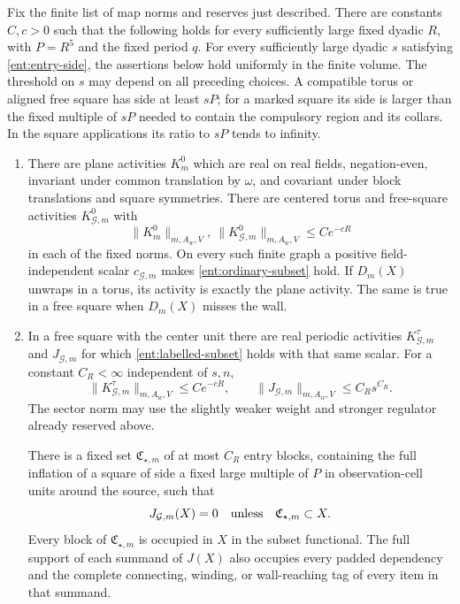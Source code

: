 \begin{theorem}\label{ent:initialization}
Fix the finite list of map norms and reserves just described.  There
are constants \(C,c>0\) such that the following holds for every
sufficiently large fixed dyadic \(R\), with \(P=R^5\) and the fixed
period \(q\).  For every sufficiently large dyadic \(s\) satisfying
\eqref{ent:entry-side}, the assertions below hold uniformly in the
finite volume.  The threshold on \(s\) may depend on all preceding
choices.  A compatible torus or aligned free square has side at
least \(sP\); for a marked square its side is larger than the fixed
multiple of \(sP\) needed to contain the compulsory region and its
collars.  In the square applications its ratio to \(sP\) tends to
infinity.

\begin{enumerate}
\item There are plane activities \(K_m^0\) which are real on real
fields, negation-even, invariant under common translation by
\(\omega\), and covariant under block translations and square
symmetries.  There are centered torus and free-square activities
\(K_{\mathcal G,m}^0\) with
\[
                  \|K_m^0\|_{m,A_w,V},
                  \ \|K_{\mathcal G,m}^0\|_{m,A_w,V}
                         \le Ce^{-cR}
\]
in each of the fixed norms.  On every such finite graph a positive
field-independent scalar \(c_{\mathcal G,m}\) makes
\eqref{ent:ordinary-subset} hold.  If \(D_m(X)\) unwraps in a torus,
its activity is exactly the plane activity.  The same is true in a
free square when \(D_m(X)\) misses the wall.

\item In a free square with the center unit there are real periodic
activities \(K_{\mathcal G,m}^\tau\) and \(J_{\mathcal G,m}\) for which
\eqref{ent:labelled-subset} holds with that same scalar.  For a constant
\(C_R<\infty\) independent of \(s,n\),
\begin{equation}\label{ent:label-norm}
 \|K_{\mathcal G,m}^\tau\|_{m,A_w,V}\le Ce^{-cR},
 \qquad
 \|J_{\mathcal G,m}\|_{m,A_w,V}\le C_Rs^{C_R}.
\end{equation}
The sector norm may use the slightly weaker weight and stronger
regulator already reserved above.

There is a fixed set \(\mathfrak C_{\star,m}\) of at most \(C_R\)
entry blocks, containing the full inflation of a square of side a
fixed large multiple of \(P\) in observation-cell units around the
source, such that
\begin{equation}\label{ent:compulsory-support}
       J_{\mathcal G,m}(X)=0
                  \quad\hbox{unless}\quad
                  \mathfrak C_{\star,m}\subset X.
\end{equation}
Every block of \(\mathfrak C_{\star,m}\) is occupied in \(X\) in
the subset functional.  The full support of each summand of \(J(X)\)
also occupies every padded dependency and the complete connecting,
winding, or wall-reaching tag of every item in that summand.


\end{enumerate}
\end{theorem}
